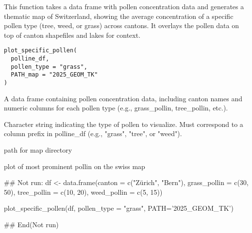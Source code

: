 \documentclass[letterpaper]{book}
\begin{document}
%
\begin{Description}
This function takes a data frame with pollen concentration data and generates
a thematic map of Switzerland, showing the average concentration of a specific
pollen type (tree, weed, or grass) across cantons. It overlays the pollen data
on top of canton shapefiles and lakes for context.
\end{Description}
%
\begin{Usage}
\begin{verbatim}
plot_specific_pollen(
  polline_df,
  pollen_type = "grass",
  PATH_map = "2025_GEOM_TK"
)
\end{verbatim}
\end{Usage}
%
\begin{Arguments}
\begin{ldescription}
\item[\code{polline\_df}] A data frame containing pollen concentration data, including canton names
and numeric columns for each pollen type (e.g., grass\_pollin, tree\_pollin, etc.).

\item[\code{pollen\_type}] Character string indicating the type of pollen to visualize.
Must correspond to a column prefix in polline\_df (e.g., "grass", "tree", or "weed").

\item[\code{PATH\_map}] path for map directory
\end{ldescription}
\end{Arguments}
%
\begin{Value}
plot of most prominent pollin on the swiss map
\end{Value}
%
\begin{Examples}
\begin{ExampleCode}
## Not run: 
df <- data.frame(canton = c("Zürich", "Bern"),
                 grass_pollin = c(30, 50),
                 tree_pollin = c(10, 20),
                 weed_pollin = c(5, 15))

plot_specific_pollen(df, pollen_type = "grass", PATH='2025_GEOM_TK')

## End(Not run)

\end{ExampleCode}
\end{Examples}
\printindex{}
\end{document}

